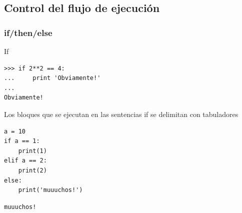 \documentclass[10pt,colorlinks]{beamer}
\begin{document}
\subsection{Control del flujo de ejecución}
\begin{frame}[fragile]\frametitle{if/then/else}
\begin{block}{If}
\tiny
\begin{verbatim}
>>> if 2**2 == 4:
...     print 'Obviamente!'
... 
Obviamente!
\end{verbatim}


\end{block}
\begin{block}{Los bloques que se ejecutan en las sentencias if se delimitan con tabuladores}
\tiny
\begin{verbatim}
a = 10
if a == 1:
    print(1)
elif a == 2:
    print(2)
else:
    print('muuuchos!')

\end{verbatim}
\begin{verbatim}
muuuchos!
\end{verbatim}

\end{block}
\end{frame}
\end{document}
